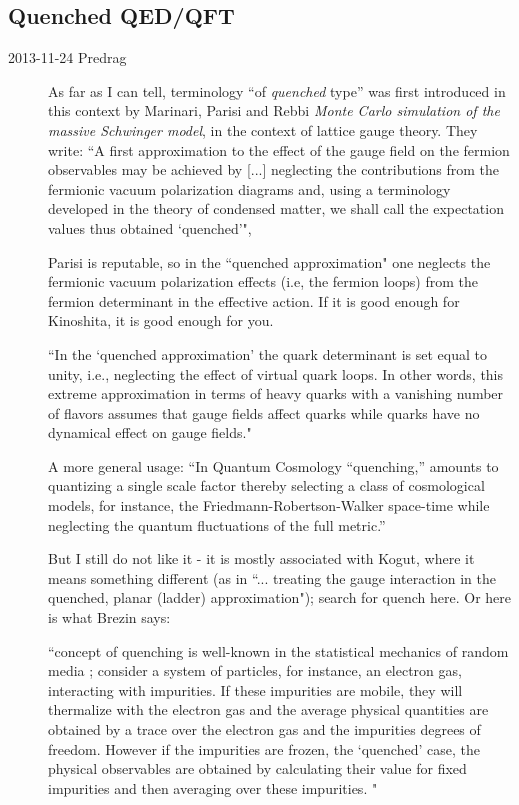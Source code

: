 \subsection{Quenched QED/QFT}
\label{sect:quenched QE}
\begin{description}
\item[2013-11-24  Predrag]
As far as I can tell, terminology ``of \emph{quenched} type'' was first
introduced in this context by
Marinari, Parisi and Rebbi
{\em {Monte Carlo} simulation of the massive {Schwinger} model},
in the context of lattice gauge theory. They write:
``A first approximation to the effect of the gauge field on the fermion
observables may be achieved by [...] neglecting the contributions from
the fermionic vacuum polarization diagrams and, using a terminology
developed in the theory of condensed matter, we shall call the
expectation values thus obtained `quenched'",

Parisi is reputable, so in the ``quenched approximation" one neglects
the fermionic vacuum polarization effects (i.e, the fermion loops) from
the fermion determinant in the effective action. If it is good enough for Kinoshita,
it is good enough for you.

``In the `quenched approximation' the quark determinant is set equal to
unity, i.e., neglecting the effect of virtual quark loops. In
other words, this extreme approximation in terms of heavy quarks with a
vanishing number of flavors assumes that gauge fields affect quarks while
quarks have no dynamical effect on gauge fields."

A more general usage: ``In Quantum Cosmology ``quenching,'' amounts to
quantizing a single scale factor thereby selecting a class of
cosmological models, for instance, the Friedmann-Robertson-Walker
space-time while neglecting the quantum fluctuations of the full
metric.''

But I still do not like it - it is mostly associated with Kogut, where it
means something different (as in ``... treating the gauge interaction in
the quenched, planar (ladder) approximation"); search for quench
 {here}. Or
here is what Brezin says:

``concept of quenching is well-known in the statistical mechanics of
random media ; consider a system of particles, for instance, an electron
gas, interacting with impurities. If these impurities are mobile, they
will thermalize with the electron gas and the average physical quantities
are obtained by a trace over the electron gas and the impurities degrees
of freedom. However if the impurities are frozen, the `quenched' case,
the physical observables are obtained by calculating their value for
fixed impurities and then averaging over these
impurities. "


\end{description}

